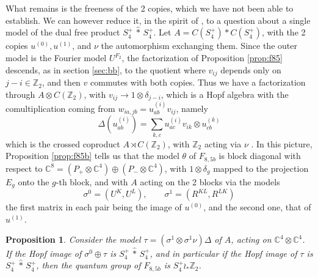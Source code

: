 \documentclass[11pt]{amsart}
\newtheorem{proposition}[theorem]{Proposition}
\begin{document}
What remains is the freeness of the 2 copies, which we have not been able to establish. We can however reduce it, in the spirit of \cite{bb3,bic}, to a question about a single model of the dual free product $S_4^+\,\hat{*}\,S_4^+$. Let $A=C(S_4^+)*C(S_4^+)$, with the 2 copies $u^{(0)},u^{(1)}$, and $\nu$ the automorphism exchanging them. Since the outer model is the Fourier model $U^{F_2}$, the factorization of Proposition \ref{prop:f85} descends, as in section \ref{sec:bb}, to the quotient where $v_{ij}$ depends only on $j-i\in\mathbb Z_2$, and then $v$ commutes with both copies. Thus we have a factorization through $A\otimes C(\mathbb Z_2)$, with $v_{ij}\to1\otimes\delta_{j-i}$, which is a Hopf algebra with the comultiplication coming from $w_{ia,jb}=u^{(i)}_{ab}v_{ij}$, namely
$$\Delta(u^{(i)}_{ab})=\sum_{k,c}u^{(i)}_{ac}v_{ik}\otimes u^{(k)}_{cb}$$
which is the crossed coproduct $A\rtimes C(\mathbb Z_2)$, with $\mathbb Z_2$ acting via $\nu$ \cite{bb3,bic}. In this picture, Proposition \ref{prop:f85b} tells us that the model $\theta$ of $F_{8,5b}$ is block diagonal with respect to $\mathbb C^8=(P_+\otimes\mathbb C^4)\oplus(P_-\otimes\mathbb C^4)$, with $1\otimes\delta_g$ mapped to the projection $E_g$ onto the $g$-th block, and with $A$ acting on the 2 blocks via the models
$$\sigma^0=(U^K,U^L),\qquad\sigma^1=(R^{KL},R^{LK})$$
the first matrix in each pair being the image of $u^{(0)}$, and the second one, that of $u^{(1)}$.

\begin{proposition}\label{prop:reduction}
Consider the model $\tau=(\sigma^1\otimes\sigma^1\nu)\Delta$ of $A$, acting on $\mathbb C^4\otimes\mathbb C^4$. If the Hopf image of $\sigma^0\oplus\tau$ is $S_4^+\,\hat{*}\,S_4^+$, and in particular if the Hopf image of $\tau$ is $S_4^+\,\hat{*}\,S_4^+$, then the quantum group of $F_{8,5b}$ is $S_4^+\wr_*\mathbb Z_2$.
\end{proposition}
\end{document}
